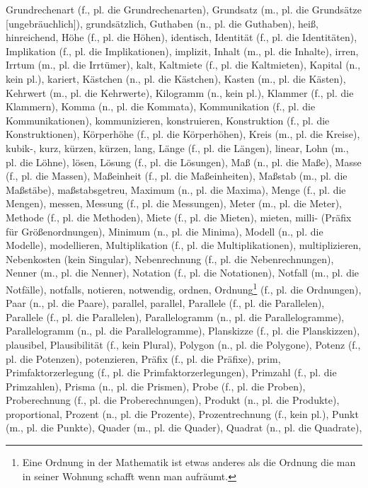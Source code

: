 Grundrechenart (f., pl. die Grundrechenarten),
Grundsatz (m., pl. die Grundsätze [ungebräuchlich]),
grundsätzlich,
Guthaben (n., pl. die Guthaben),
heiß,
hinreichend,
Höhe (f., pl. die Höhen),
identisch,
Identität (f., pl. die Identitäten),
Implikation (f., pl. die Implikationen),
implizit,
Inhalt (m., pl. die Inhalte),
irren,
Irrtum (m., pl. die Irrtümer),
kalt,
Kaltmiete (f., pl. die Kaltmieten),
Kapital (n., kein pl.),
kariert,
Kästchen (n., pl. die Kästchen),
Kasten (m., pl. die Kästen),
Kehrwert (m., pl. die Kehrwerte),
Kilogramm (n., kein pl.),
Klammer (f., pl. die Klammern),
Komma (n., pl. die Kommata),
Kommunikation (f., pl. die Kommunikationen),
kommunizieren,
konstruieren,
Konstruktion (f., pl. die Konstruktionen),
Körperhöhe (f., pl. die Körperhöhen),
Kreis (m., pl. die Kreise),
kubik-,
kurz,
kürzen,
kürzen,
lang,
Länge (f., pl. die Längen),
linear,
Lohn (m., pl. die Löhne),
lösen,
Lösung (f., pl. die Lösungen),
Maß (n., pl. die Maße),
Masse (f., pl. die Massen),
Maßeinheit (f., pl. die Maßeinheiten),
Maßstab (m., pl. die Maßstäbe),
maßstabsgetreu,
Maximum (n., pl. die Maxima),
Menge (f., pl. die Mengen),
messen,
Messung (f., pl. die Messungen),
Meter (m., pl. die Meter),
Methode (f., pl. die Methoden),
Miete (f., pl. die Mieten),
mieten,
milli- (Präfix für Größenordnungen),
Minimum (n., pl. die Minima),
Modell (n., pl. die Modelle),
modellieren,
Multiplikation (f., pl. die Multiplikationen),
multiplizieren,
Nebenkosten (kein Singular),
Nebenrechnung (f., pl. die Nebenrechnungen),
Nenner (m., pl. die Nenner),
Notation (f., pl. die Notationen),
Notfall (m., pl. die Notfälle),
notfalls,
notieren,
notwendig,
ordnen,
Ordnung\footnote{Eine Ordnung in der Mathematik ist etwas anderes als die Ordnung die man in seiner Wohnung schafft wenn man aufräumt.} (f., pl. die Ordnungen),
Paar (n., pl. die Paare),
parallel,
parallel,
Parallele (f., pl. die Parallelen),
Parallele (f., pl. die Parallelen),
Parallelogramm (n., pl. die Parallelogramme),
Parallelogramm (n., pl. die Parallelogramme),
Planskizze (f., pl. die Planskizzen),
plausibel,
Plausibilität (f., kein Plural),
Polygon (n., pl. die Polygone),
Potenz (f., pl. die Potenzen),
potenzieren,
Präfix (f., pl. die Präfixe),
prim,
Primfaktorzerlegung (f., pl. die Primfaktorzerlegungen),
Primzahl (f., pl. die Primzahlen),
Prisma (n., pl. die Prismen),
Probe (f., pl. die Proben),
Proberechnung (f., pl. die Proberechnungen),
Produkt (n., pl. die Produkte),
proportional,
Prozent (n., pl. die Prozente),
Prozentrechnung (f., kein pl.),
Punkt (m., pl. die Punkte),
Quader (m., pl. die Quader),
Quadrat (n., pl. die Quadrate),
